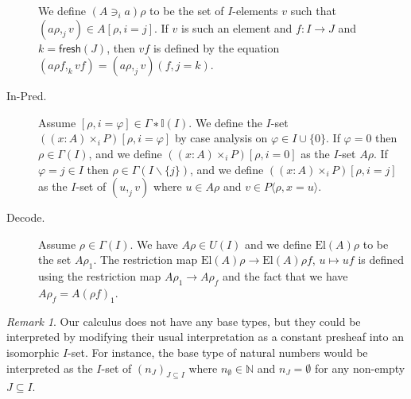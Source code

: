 \documentclass[english]{PaperTools/latex/entcs}
\theoremstyle{plain}
\theoremstyle{definition}
\theoremstyle{remark}
\newtheorem*{remark}{Remark}
\newcommand\CTimes[2]{(#2) ×_{#1}}
\newcommand\op[1]{∋_{#1}}
\def\fresh#1{\mathsf{fresh}(#1)}
\def\El#1{\mathrm{El}(#1)}
\begin{document}
\begin{description}
    We define $(A \op {i} a)ρ$ to be the set of $I$-elements $v$ such that
    $(aρ,_j v) ∈ A[ρ,i=j]$.
    If $v$ is such an element and $f : I → J$ and $k=\fresh J$, then
    $vf$ is defined by the equation $(aρf,_k vf) = (aρ ,_j v)(f, j=k)$.


  \item[\sc In-Pred.]
    Assume $[ρ,i=φ] ∈ Γ∗𝕀(I)$.  We define the $I$-set $(\CTimes i {x:A} P)[ρ,i=φ]$
    by case analysis on $φ ∈ I∪\{0\}$.
    If $φ = 0$ then $ρ ∈ Γ(I)$, and we define $(\CTimes i {x:A} P)[ρ,i=0]$ as
    the $I$-set $Aρ$.
    If $φ = j ∈ I$ then $ρ ∈ Γ(I\backslash\{j\})$, and we define
    $(\CTimes i {x:A} P)[ρ,i=j]$ as the $I$-set of $(u ,_j v)$ where
    $u ∈ Aρ$ and $v ∈ P⟨ρ,x=u⟩$.


  \item[\sc Decode.]
    Assume $ρ ∈ Γ(I)$.  We have $Aρ ∈ U(I)$ and we define
    $\El{A}ρ$ to be the set $Aρ_1$.
    The restriction map $\El{A}ρ → \El{A}ρf$, $u ↦ uf$ is defined
    using the restriction map $Aρ_1 → Aρ_f$ and the fact that we have
    $Aρ_f = A(ρf)_1$.
\end{description}

\begin{remark}
  Our calculus does not have any base types, but they could be interpreted
  by modifying their usual interpretation as a constant presheaf into an
  isomorphic $I$-set.
  For instance, the base type of natural numbers would be interpreted as
  the $I$-set of $(n_J)_{J ⊆ I}$ where $n_∅ ∈ ℕ$ and $n_J = ∅$ for any
  non-empty $J ⊆ I$.
\end{remark}
\end{document}
